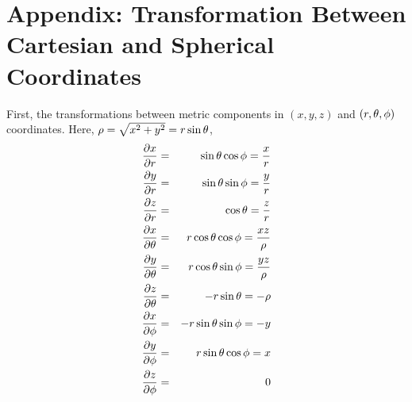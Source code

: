 \documentclass{article}
\begin{document}
\section{Appendix: Transformation Between Cartesian and Spherical Coordinates}

First, the transformations between metric components in $(x,y,z)$ and $(r,\theta,\phi)$ coordinates. Here, $\rho=\sqrt{x^2+y^2}=r\sin\theta$,
\begin{eqnarray*}
  \frac{\partial x}{\partial r}
  &=&
  \sin\theta\cos\phi 
  =
  \frac{x}{r}
\\
  \frac{\partial y}{\partial r}
  &=&
  \sin\theta\sin\phi 
  =
  \frac{y}{r}
\\
  \frac{\partial z}{\partial r}
  &=&
  \cos\theta 
  =
  \frac{z}{r}
\\
  \frac{\partial x}{\partial \theta}
  &=&
  r\cos\theta\cos\phi 
  =
  \frac{xz}{\rho}
\\
  \frac{\partial y}{\partial \theta}
  &=&
  r\cos\theta\sin\phi 
  =
  \frac{yz}{\rho}
\\
  \frac{\partial z}{\partial \theta}
  &=&
  -r\sin\theta 
  =
  -\rho
\\
  \frac{\partial x}{\partial \phi}
  &=&
  -r\sin\theta\sin\phi
  =
  -y
\\
  \frac{\partial y}{\partial \phi}
  &=&
  r\sin\theta\cos\phi 
  =
  x
\\
  \frac{\partial z}{\partial \phi}
  &=&
  0
\end{eqnarray*}
\end{document}
